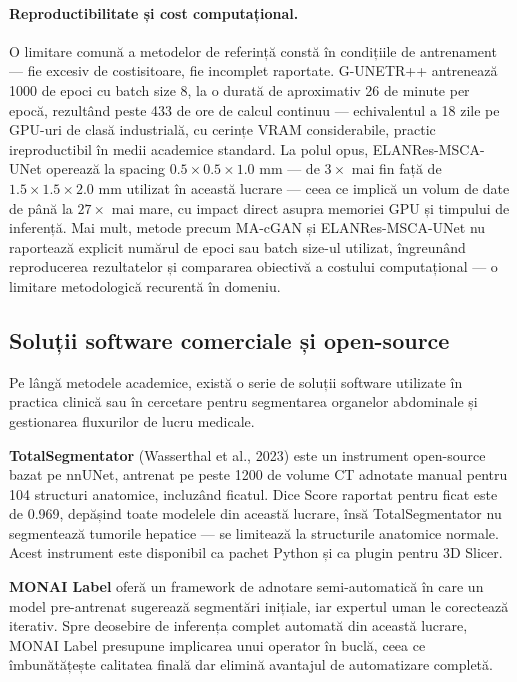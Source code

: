 \documentclass[12pt, a4paper]{report}
\begin{document}
\paragraph{Reproductibilitate și cost computațional.}
O limitare comună a metodelor de referință constă în condițiile
de antrenament — fie excesiv de costisitoare, fie incomplet
raportate. G-UNETR++ antrenează 1000 de epoci cu batch size 8,
la o durată de aproximativ 26 de minute per epocă, rezultând
peste 433 de ore de calcul continuu — echivalentul a 18 zile pe
GPU-uri de clasă industrială, cu cerințe VRAM considerabile,
practic ireproductibil în medii academice standard. La polul
opus, ELANRes-MSCA-UNet operează la spacing $0.5\times0.5\times1.0$
mm — de $3\times$ mai fin față de $1.5\times1.5\times2.0$ mm
utilizat în această lucrare — ceea ce implică un volum de date
de până la $27\times$ mai mare, cu impact direct asupra memoriei
GPU și timpului de inferență. Mai mult, metode precum MA-cGAN și
ELANRes-MSCA-UNet nu raportează explicit numărul de epoci sau
batch size-ul utilizat, îngreunând reproducerea rezultatelor și
compararea obiectivă a costului computațional — o limitare
metodologică recurentă în domeniu.




\subsection{Soluții software comerciale și open-source}

Pe lângă metodele academice, există o serie de soluții software
utilizate în practica clinică sau în cercetare pentru segmentarea
organelor abdominale și gestionarea fluxurilor de lucru medicale.

\textbf{TotalSegmentator} (Wasserthal et al., 2023) este un
instrument open-source bazat pe nnUNet, antrenat pe peste 1200
de volume CT adnotate manual pentru 104 structuri anatomice,
incluzând ficatul. Dice Score raportat pentru ficat este de 0.969,
depășind toate modelele din această lucrare, însă TotalSegmentator
nu segmentează tumorile hepatice — se limitează la structurile
anatomice normale. Acest instrument este disponibil ca pachet
Python și ca plugin pentru 3D Slicer.

\textbf{MONAI Label} oferă un framework de adnotare semi-automatică
în care un model pre-antrenat sugerează segmentări inițiale, iar
expertul uman le corectează iterativ. Spre deosebire de inferența
complet automată din această lucrare, MONAI Label presupune
implicarea unui operator în buclă, ceea ce îmbunătățește calitatea
finală dar elimină avantajul de automatizare completă.
\end{document}

